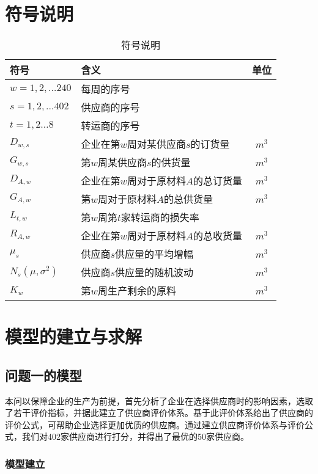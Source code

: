 \documentclass[withoutpreface,bwprint]{cumcmthesis} %
\begin{document}
\section{符号说明}

\begin{table}[!htbp]
\caption{符号说明}\label{tab:Nomenc} \centering  %
\begin{tabular}{llc}  %
\toprule[1.5pt]
 符号 & 含义 & 单位 \\
\midrule[1pt]
 $w=1,2,\ldots240$  & 每周的序号 &   \\
 $s=1,2,\ldots402$  & 供应商的序号 &    \\
 $t=1,2\ldots8$ & 转运商的序号 & \\
 $D_{w,s}$  & 企业在第$w$周对某供应商$s$的订货量 & $m^3$ \\
 $G_{w,s}$  & 第$w$周某供应商$s$的供货量 & $m^3$ \\
 $D_{A,w}$  & 企业在第$w$周对于原材料$A$的总订货量   & $m^3$ \\
 $G_{A,w}$  & 第$w$周对于原材料$A$的总供货量   & $m^3$ \\
 $L_{t,w}$  & 第$w$周第$t$家转运商的损失率   &  \\
 $R_{A,w}$  & 企业在第$w$周对于原材料$A$的总收货量   & $m^3$ \\
 $\mu_s$  & 供应商$s$供应量的平均增幅   & $m^3$ \\
 $N_s(\mu,\sigma^2)$  & 供应商$s$供应量的随机波动   & $m^3$ \\
 $K_w$  & 第$w$周生产剩余的原料  & $m^3$ \\
\bottomrule[1.5pt]
\end{tabular}
\end{table}

\section{模型的建立与求解}

\subsection{问题一的模型}
本问以保障企业的生产为前提，首先分析了企业在选择供应商时的影响因素，选取了若干评价指标，并据此建立了供应商评价体系。基于此评价体系给出了供应商的评价公式，可帮助企业选择更加优质的供应商。通过建立供应商评价体系与评价公式，我们对402家供应商进行打分，并得出了最优的50家供应商。
\subsubsection{模型建立}
\end{document}
